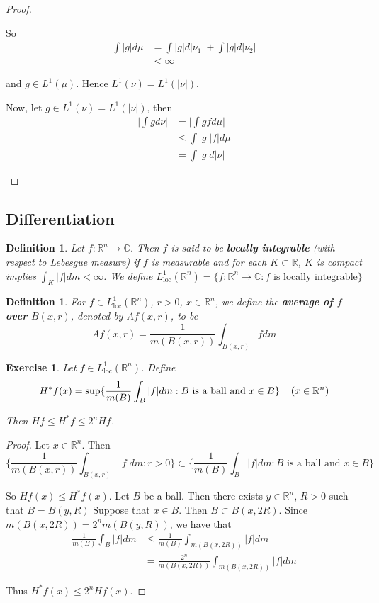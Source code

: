 \documentclass[12pt]{amsart}
\newtheorem{defn}[thm]{Definition}
\newtheorem{ex}[thm]{Exercise}
\newcommand{\C}{\mathbb{C}}
\newcommand{\R}{\mathbb{R}}
\newcommand{\Ll}{L^1_{\text{loc}}(\R^n)}
\begin{document}
\begin{proof}
\begin{enumerate}
So 
\begin{align*}
\int |g| d\mu
& =\int |g| d|\nu_1| + \int |g| d |\nu_2| \\
& < \infty
\end{align*}

and $g \in L^1(\mu)$. Hence $L^1(\nu) = L^1(|\nu|)$. 

Now, let $g \in L^1(\nu) = L^1(|\nu|)$, then 
\begin{align*}
\bigg| \int g d\nu \bigg| 
&= \bigg| \int g f d\mu \bigg| \\
& \leq \int |g||f|d\mu\\
& = \int |g| d |\nu|
\end{align*}

\end{enumerate}
\end{proof}

\subsection{Differentiation}

\begin{defn}
Let $f: \R^n \rightarrow \C$. Then $f$ is said to be \textbf{locally integrable} (with respect to Lebesgue measure) if $f$ is measurable and for each $K \subset \R$, $K$ is compact implies $\int_K |f| dm < \infty$. We define $L^1_{\text{loc}}(\R^n) = \{f:\R^n \rightarrow \C: f \text{ is locally integrable}\}$
\end{defn}

\begin{defn}
For $f \in \Ll$, $r>0$, $x \in \R^n$, we define the \textbf{average of $f$ over $B(x,r)$}, denoted by $Af(x,r)$, to be $$Af(x,r) = \frac{1}{m(B(x,r))}\int_{B(x,r)}fdm$$
\end{defn}

\begin{ex}
Let $f \in \Ll$. Define $$H^*f(x) = \sup\{\frac{1}{m(B)}\int_{B}|f|dm: B \text{ is a ball and } x \in B\} \hspace{4mm} (x \in \R^n)$$

Then $Hf \leq H^*f \leq 2^n Hf$. 
\end{ex}

\begin{proof}
Let $x \in \R^n$. Then $$\bigg \{ \frac{1}{m(B(x,r))}\int_{B(x,r)}|f|dm: r >0\bigg \} \subset \bigg\{ \frac{1}{m(B)}\int_{B}|f|dm: B \text{ is a ball and } x \in B \bigg\} $$

So $Hf(x) \leq H^*f(x)$. Let $B$ be a ball. Then there exists $y \in \R^n$, $R>0$ such that $B = B(y,R)$ Suppose that $x \in B$. Then $B \subset B(x,2R)$. Since $m(B(x,2R)) = 2^n m(B(y,R))$, we have that 
\begin{align*}
\frac{1}{m(B)}\int_{B}|f|dm
& \leq \frac{1}{m(B)} \int_{m(B(x,2R))}|f|dm\\
&= \frac{2^n}{m(B(x,2R))} \int_{m(B(x,2R))}|f|dm
\end{align*}

Thus $H^*f(x) \leq 2^n Hf(x)$.
\end{proof}
\end{document}
